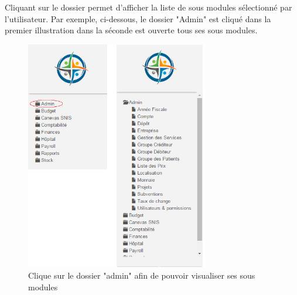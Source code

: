 \documentclass[12pt,a4paper]{report}
\begin{document}
Cliquant sur le dossier permet d'afficher la liste de sous modules sélectionné par l'utilisateur. Par exemple, ci-dessous, le dossier "Admin" est cliqué dans la premier illustration dans la séconde est ouverte tous ses sous modules.

\begin{figure}[h]
\begin{center}
\includegraphics[width=8cm]{pic/open_folder.png}
\end{center}
\caption{Clique sur le dossier "admin" afin de pouvoir visualiser ses sous modules}
\label{Clique sur le dossier "admin" afin de pouvoir visualiser ses sous modules}
\end{figure} 


\newpage
\end{document}
